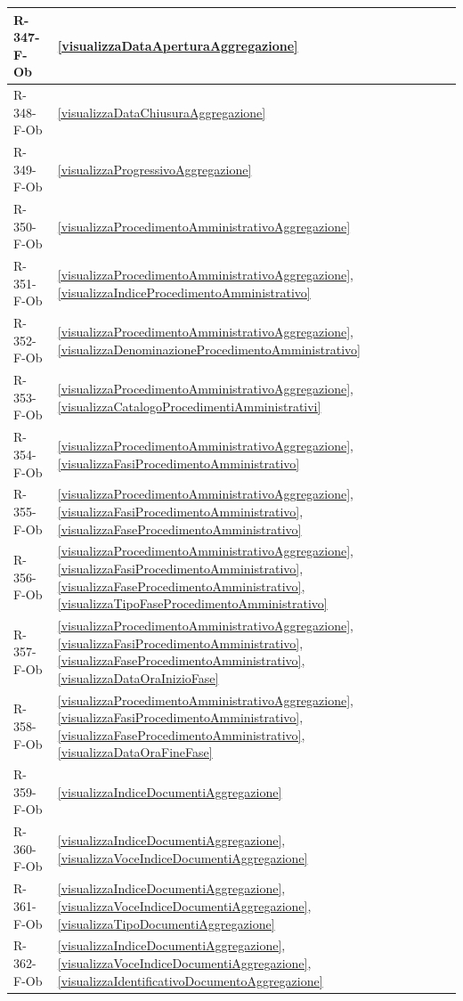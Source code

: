 \begin{longtable}{|p{4cm}|p{10cm}|}
\hline
R-347-F-Ob & \ref{visualizzaDataAperturaAggregazione} \\
\hline
R-348-F-Ob & \ref{visualizzaDataChiusuraAggregazione} \\
\hline
R-349-F-Ob & \ref{visualizzaProgressivoAggregazione} \\
\hline
R-350-F-Ob & \ref{visualizzaProcedimentoAmministrativoAggregazione} \\
\hline
R-351-F-Ob & \ref{visualizzaProcedimentoAmministrativoAggregazione}, \ref{visualizzaIndiceProcedimentoAmministrativo} \\
\hline
R-352-F-Ob & \ref{visualizzaProcedimentoAmministrativoAggregazione}, \ref{visualizzaDenominazioneProcedimentoAmministrativo} \\
\hline
R-353-F-Ob & \ref{visualizzaProcedimentoAmministrativoAggregazione}, \ref{visualizzaCatalogoProcedimentiAmministrativi} \\
\hline
R-354-F-Ob & \ref{visualizzaProcedimentoAmministrativoAggregazione}, \ref{visualizzaFasiProcedimentoAmministrativo} \\
\hline
R-355-F-Ob & \ref{visualizzaProcedimentoAmministrativoAggregazione}, \ref{visualizzaFasiProcedimentoAmministrativo}, \ref{visualizzaFaseProcedimentoAmministrativo} \\
\hline
R-356-F-Ob & \ref{visualizzaProcedimentoAmministrativoAggregazione}, \ref{visualizzaFasiProcedimentoAmministrativo}, \ref{visualizzaFaseProcedimentoAmministrativo}, \ref{visualizzaTipoFaseProcedimentoAmministrativo} \\
\hline
R-357-F-Ob & \ref{visualizzaProcedimentoAmministrativoAggregazione}, \ref{visualizzaFasiProcedimentoAmministrativo}, \ref{visualizzaFaseProcedimentoAmministrativo}, \ref{visualizzaDataOraInizioFase} \\
\hline
R-358-F-Ob & \ref{visualizzaProcedimentoAmministrativoAggregazione}, \ref{visualizzaFasiProcedimentoAmministrativo}, \ref{visualizzaFaseProcedimentoAmministrativo}, \ref{visualizzaDataOraFineFase} \\
\hline
R-359-F-Ob & \ref{visualizzaIndiceDocumentiAggregazione} \\
\hline
R-360-F-Ob & \ref{visualizzaIndiceDocumentiAggregazione}, \ref{visualizzaVoceIndiceDocumentiAggregazione} \\
\hline
R-361-F-Ob & \ref{visualizzaIndiceDocumentiAggregazione}, \ref{visualizzaVoceIndiceDocumentiAggregazione}, \ref{visualizzaTipoDocumentiAggregazione} \\
\hline
R-362-F-Ob & \ref{visualizzaIndiceDocumentiAggregazione}, \ref{visualizzaVoceIndiceDocumentiAggregazione}, \ref{visualizzaIdentificativoDocumentoAggregazione} \\

\end{longtable}
